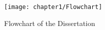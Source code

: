 \begin{figure}[htbp]
	\centering
	\texttt{[image: chapter1/Flowchart]}
	\caption{Flowchart of the Dissertation}
	\label{fig:chp1:Flowchart}
\end{figure}

\clearpage %

% 
